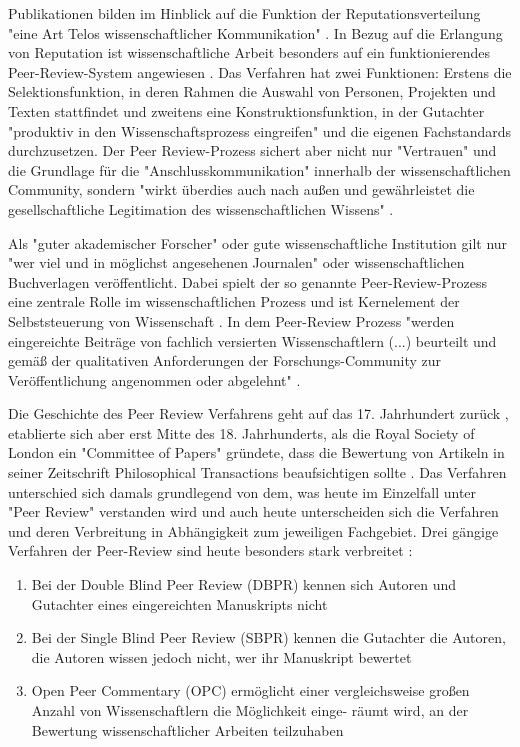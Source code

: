 Publikationen bilden im Hinblick auf die Funktion der Reputationsverteilung "eine Art Telos wissenschaftlicher Kommunikation" \cite{hirschauer2004peer}. In Bezug auf die Erlangung von Reputation ist wissenschaftliche Arbeit besonders auf ein funktionierendes Peer-Review-System angewiesen \cite{Luescher_2014}. Das Verfahren hat zwei Funktionen: Erstens die Selektionsfunktion, in deren Rahmen die Auswahl von Personen, Projekten und Texten stattfindet und zweitens eine Konstruktionsfunktion, in der Gutachter "produktiv in den Wissenschaftsprozess eingreifen" \cite{Neidhardt_2010} und die eigenen Fachstandards durchzusetzen. Der Peer Review-Prozess sichert aber nicht nur "Vertrauen" und die Grundlage für die "Anschlusskommunikation" innerhalb der wissenschaftlichen Community, sondern "wirkt überdies auch nach außen und gewährleistet die gesellschaftliche Legitimation des wissenschaftlichen Wissens" \cite{pscheida_2010_wikipedia}.

Als "guter akademischer Forscher" oder gute wissenschaftliche Institution gilt nur "wer viel und in möglichst angesehenen Journalen" \cite{Frey_2005} oder wissenschaftlichen Buchverlagen veröffentlicht. Dabei spielt der so genannte Peer-Review-Prozess eine zentrale Rolle im wissenschaftlichen Prozess \cite{smith_1999_opening} und ist Kernelement der Selbststeuerung von Wissenschaft \cite{Neidhardt_2010}. In dem Peer-Review Prozess "werden eingereichte Beiträge von fachlich versierten Wissenschaftlern (...) beurteilt und gemäß der qualitativen Anforderungen der Forschungs-Community zur Veröffentlichung angenommen oder abgelehnt" \cite{Hess_2006}.

Die Geschichte des Peer Review Verfahrens geht auf das 17. Jahrhundert zurück \cite{Kronick_1978}, etablierte sich aber erst Mitte des 18. Jahrhunderts, als die Royal Society of London ein "Committee of Papers" gründete, dass die Bewertung von Artikeln in seiner Zeitschrift Philosophical Transactions beaufsichtigen sollte \cite{Kronick_1990}. Das Verfahren unterschied sich damals grundlegend von dem, was heute im Einzelfall unter "Peer Review" verstanden wird und auch heute unterscheiden sich die Verfahren und deren Verbreitung in Abhängigkeit zum jeweiligen Fachgebiet. Drei gängige Verfahren der Peer-Review sind heute besonders stark verbreitet \cite{mueller_2009_peerreview}:
\begin{enumerate}
\item Bei der Double Blind Peer Review (DBPR) kennen sich Autoren und Gutachter eines eingereichten Manuskripts nicht
\item Bei der Single Blind Peer Review (SBPR) kennen die Gutachter die Autoren, die Autoren wissen jedoch nicht, wer ihr Manuskript bewertet
\item Open Peer Commentary (OPC) ermöglicht einer vergleichsweise großen Anzahl von Wissenschaftlern die Möglichkeit einge-
räumt wird, an der Bewertung wissenschaftlicher Arbeiten teilzuhaben
\end{enumerate}

